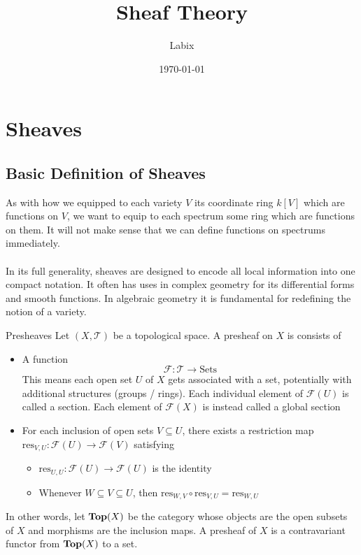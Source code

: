 \documentclass[a4paper]{article}
\title{Sheaf Theory}
\author{Labix}
\date{\today}
\begin{document}
\maketitle
\begin{abstract}
\end{abstract}
\pagebreak
\tableofcontents
\pagebreak

\section{Sheaves}
\subsection{Basic Definition of Sheaves}
As with how we equipped to each variety $V$ its coordinate ring $k[V]$ which are functions on $V$, we want to equip to each spectrum some ring which are functions on them. It will not make sense that we can define functions on spectrums immediately. \\~\\

In its full generality, sheaves are designed to encode all local information into one compact notation. It often has uses in complex geometry for its differential forms and smooth functions. In algebraic geometry it is fundamental for redefining the notion of a variety. 

\begin{defn}{Presheaves}{} Let $(X,\mathcal{T})$ be a topological space. A presheaf on $X$ is consists of
\begin{itemize}
\item A function $$\mathcal{F}:\mathcal{T}\to\text{Sets}$$ This means each open set $U$ of $X$ gets associated with a set, potentially with additional structures (groups / rings). Each individual element of $\mathcal{F}(U)$ is called a section. Each element of $\mathcal{F}(X)$ is instead called a global section
\item For each inclusion of open sets $V\subseteq U$, there exists a restriction map $\text{res}_{V,U}:\mathcal{F}(U)\to\mathcal{F}(V)$
 satisfying
\begin{itemize}
\item $\text{res}_{U,U}:\mathcal{F}(U)\to\mathcal{F}(U)$ is the identity
\item Whenever $W\subseteq V\subseteq U$, then $\text{res}_{W,V}\circ\text{res}_{V,U}=\text{res}_{W,U}$
\end{itemize}
\end{itemize}
In other words, let $\bold{Top}(X)$ be the category whose objects are the open subsets of $X$ and morphisms are the inclusion maps. A presheaf of $X$ is a contravariant functor from $\bold{Top}(X)$ to a set.
\end{defn}
\end{document}

